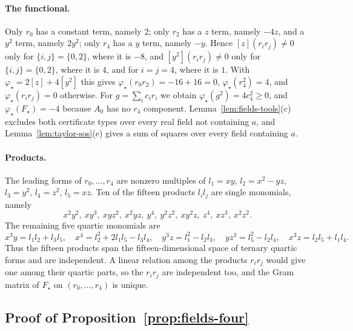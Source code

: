 \paragraph{The functional.}
Only $r_0$ has a constant term, namely $2$; only $r_2$ has a $z$ term,
namely $-4z$, and a $y^2$ term, namely $2y^2$; only $r_4$ has a $y$ term,
namely $-y$. Hence $[z](r_ir_j)\ne0$ only for $\{i,j\}=\{0,2\}$, where it is
$-8$, and $[y^2](r_ir_j)\ne0$ only for $\{i,j\}=\{0,2\}$, where it is $4$,
and for $i=j=4$, where it is $1$. With
$\varphi_\star=2[z]+4[y^2]$ this gives $\varphi_\star(r_0r_2)=-16+16=0$,
$\varphi_\star(r_4^2)=4$, and $\varphi_\star(r_ir_j)=0$ otherwise. For
$g=\sum_ic_ir_i$ we obtain $\varphi_\star(g^2)=4c_4^2\ge0$, and
$\varphi_\star(F_\star)=-4$ because $A_0$ has no $r_4$ component.
Lemma~\ref{lem:fields-tools}(c) excludes both certificate types over every
real field not containing $a$, and Lemma~\ref{lem:taylor-sos}(e) gives a
sum of squares over every field containing $a$.

\paragraph{Products.}
The leading forms of $r_0,\ldots,r_4$ are nonzero multiples of
$l_1=xy$, $l_2=x^2-yz$, $l_3=y^2$, $l_4=z^2$,
$l_5=xz$. Ten of the fifteen products $l_il_j$ are single monomials,
namely
\[
 x^2y^2,\ xy^3,\ xyz^2,\ x^2yz,\ y^4,\ y^2z^2,\ xy^2z,\ z^4,\ xz^3,\ x^2z^2 .
\]
The remaining five quartic monomials are
\[
 x^3y=l_1l_2+l_3l_5,\quad
 x^4=l_2^2+2l_1l_5-l_3l_4,\quad
 y^3z=l_1^2-l_2l_3,\quad
 yz^3=l_5^2-l_2l_4,\quad
 x^3z=l_2l_5+l_1l_4 .
\]
Thus the fifteen products span the fifteen-dimensional space of ternary
quartic forms and are independent. A linear relation among the products
$r_ir_j$ would give one among their quartic parts, so the $r_ir_j$ are
independent too, and the Gram matrix of $F_\star$ on $(r_0,\ldots,r_4)$ is
unique.

\subsection{Proof of Proposition~\ref{prop:fields-four}}
\label{app:fields-four}

